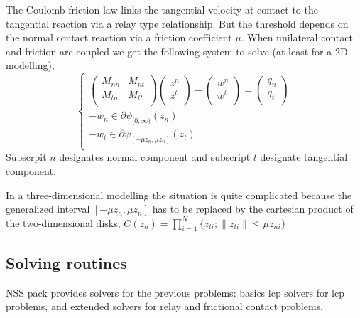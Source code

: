 The Coulomb friction law links the tangential velocity at contact to the tangential reaction via a relay type relationship. But the threshold depends on the normal contact reaction via a friction coefficient $\mu$. When unilateral contact and friction are coupled we get the following system to solve (at least for a 2D modelling),
\begin{equation}
\left\lbrace
\begin{array}{l}
\left(
\begin{array}{cc}
M_{nn}&M_{nt}\\
M_{tn}&M_{tt}\\
\end{array}
\right)
\left(\begin{array}{c}
z^n\\
z^t\\
\end{array}
\right)-
\left(\begin{array}{c}
w^n\\
w^t\\
\end{array}
\right)=
\left(\begin{array}{c}
q_n\\
q_t\\
\end{array}
\right)\\
-w_n \in \partial\psi_{[0,\infty)}(z_n)\\
-w_t \in \partial\psi_{[-\mu z_n, \mu z_n]}(z_t)\label{coul}\\ 
\end{array}
\right.
\end{equation}
Subscrpit $n$ designates normal component and subscript $t$ designate tangential component.

In a three-dimensional modelling the situation is quite complicated because the generalized interval $[-\mu z_n, \mu z_n]$ has to be replaced by the cartesian product of the two-dimensional disks, $C(z_n)= \prod_{i=1}^{N} \{z_{ti} ; \| z_{ti}\| \le \mu z_{ni}\}$\\

\subsection{Solving routines}
NSS pack provides solvers for the previous problems: basics \ac{lcp} solvers for \ac{lcp} problems, and extended solvers for relay and frictional contact problems.

